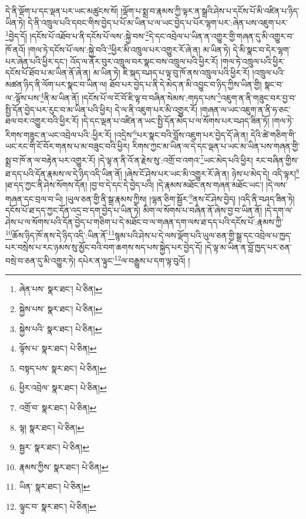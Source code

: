 དེ་ནི་ལྡོག་པ་དང་ལྡན་པར་ཡང་མཚུངས་སོ། །ལྡོག་པ་སྨྲ་བ་རྣམས་ཀྱི་ལྟར་ན་སྒྲའི་ཤེས་པ་དངོས་པོ་མི་འཛིན་པ་ཉིད་ཡིན་ཏེ། དེ་ནི་འཁྲུལ་པའི་དབང་གིས་བྱེད་པ་པོ་མ་ཡིན་པ་ལ་ཡང་བྱེད་པ་པོར་ལྷག་པར་:ཞེན་པས་འཇུག་པར་\footnote{ཞེན་པས་  སྣར་ཐང་།  པེ་ཅིན། }བྱེད་དོ། །དངོས་པོ་འཐོབ་པ་ནི་དངོས་པོ་ལས་:སྐྱེ་བས་\footnote{སྐྱེས་པས་  སྣར་ཐང་།  པེ་ཅིན། }དེ་དང་འབྲེལ་པ་ཡིན་ན་འགྱུར་གྱི་གཞན་དུ་མི་འགྱུར་བ་ཁོ་ནའོ། །གལ་ཏེ་དངོས་པོ་ལས་:སྐྱེ་བའི་\footnote{སྐྱེས་པའི་  སྣར་ཐང་།  པེ་ཅིན། }ཕྱིར་མི་འཁྲུལ་པར་འགྱུར་རོ་ཞེ་ན། མ་ཡིན་ཏེ། དེ་མི་སྣང་བ་དེར་ལྷག་པར་ཞེན་པའི་ཕྱིར་དང་། འོད་ལ་ནོར་བུར་འཁྲུལ་བར་སྣང་བས་འཁྲུལ་པའི་ཕྱིར་རོ། །གལ་ཏེ་འཁྲུལ་པའི་ཕྱིར་དངོས་པོ་ཐོབ་པ་མ་ཡིན་ནོ་ཞེ་ན། མ་ཡིན་ཏེ། ཇི་སྐད་བཤད་པ་ལྟ་བུ་ཁོ་ནས་འཁྲུལ་པའི་ཕྱིར་རོ། །འཁྲུལ་པའི་མཚན་ཉིད་ནི་ལོག་པར་སྣང་བ་ཡིན་ལ། ཐོབ་པར་བྱེད་པ་ནི་དེ་མེད་ན་མི་འབྱུང་བ་ཉིད་ཀྱིས་ཡིན་གྱི། སྣང་བ་ལ་:ལྟོས་པས་\footnote{ལྟོས་པ་  སྣར་ཐང་།  པེ་ཅིན། }ནི་མ་ཡིན་ནོ། །དངོས་པོ་ལ་ངོ་བོ་ཇི་ལྟ་བ་བཞིན་སེམས་:གཏད་པས་\footnote{བསྟད་པས་  སྣར་ཐང་།  པེ་ཅིན། }འཇུག་ན་ནི་གཟུང་བར་བྱ་བ་སྤྱི་དོན་བྱེད་པར་རུང་བ་མ་ཡིན་པའི་ཕྱིར། དེ་ལ་ནི་འཇུག་པར་མི་འགྱུར་རོ། །གཞན་ལ་ཡང་འཇུག་ན་ནི་ཧ་ཅང་ཐལ་བར་འགྱུར་བའི་ཕྱིར་རོ། །དེ་དང་ལྡན་པ་འཛིན་ན་ཡང་སྤྱི་དོན་མེད་པ་ལ་སོགས་པར་བཤད་ཟིན་ཏོ། །གལ་ཏེ་རིགས་གཟུང་ན་ཡང་འབྲེལ་པའི་:ཕྱིར་རོ། །འདྲེས་\footnote{ཕྱིར་འབྲེལ་  སྣར་ཐང་།  པེ་ཅིན། }པར་སྣང་བའི་བློས་འཇུག་པར་བྱེད་དོ་ཞེ་ན། དེའི་ཚེ་གཅིག་གི་ཡང་རང་གི་ངོ་བོར་གནས་པ་མ་བཟུང་བའི་ཕྱིར། རིགས་ཀྱང་མ་ཡིན་ལ་དེ་དང་ལྡན་པ་ཡང་མ་ཡིན་པས་གཞན་གྱི་སྨྲ་བ་ཁོ་ན་ལ་བརྟེན་པར་འགྱུར་རོ། །དེ་ལྟ་ན་ནི་འོ་ན་རྗེས་སུ་:འགྲོ་བ་འགའ་\footnote{འགྲོ་བ་  སྣར་ཐང་།  པེ་ཅིན། }ཡང་མེད་པའི་ཕྱིར། རང་བཞིན་གྱིས་ཐ་དད་པའི་དོན་རྣམས་ལ་དེ་ཉིད་འདི་ཡིན་ནོ། །ཞེས་ངོ་ཤེས་པར་ཡང་མི་འགྱུར་རོ་ཞེ་ན། ཉེས་པ་མེད་དེ། འདི་ལྟར།\footnote{ལྟ།  སྣར་ཐང་།  པེ་ཅིན། } །ཐ་དད་ཀྱང་ནི་ཤེས་སོགས་དོན། །བྱ་བ་དེ་དང་དེ་བྱེད་པའི། །དེ་རྣམས་མཐོང་ནས་གཞན་མཐོང་ཡང་། །དེ་ལས་གཞན་དང་བྲལ་བ་ཡི། །ཡུལ་ཅན་གྱི་ནི་སྒྲ་རྣམས་ཀྱིས། །ལྷན་ཅིག་སྦྱོར་\footnote{སྦྱར་  སྣར་ཐང་།  པེ་ཅིན། }ནས་ངོ་ཤེས་བྱེད། །འདི་ནི་བཤད་ཟིན་ཏེ། དངོས་པོ་ཐ་དད་ཀྱང་དོན་འདྲ་བ་དག་བྱེད་པ་ཡིན་ཏེ། མིག་ལ་སོགས་པ་བཞིན་ནོ་ཞེས་བྱ་བ་ཡིན་ནོ། །དེ་དག་ལ་ཤེས་པ་ལ་སོགས་པའི་དོན་བྱེད་པ་གཅིག་པ་དེ་མཐོང་བ་ལ་གཞན་དག་ལས་ཐ་དད་པའི་དངོས་པོ་:རྣམས་ཀྱི་\footnote{རྣམས་ཀྱིས་  སྣར་ཐང་།  པེ་ཅིན། }ཆོས་ཉིད་ཁོ་ནས་དེ་ཉིད་འདི་:ཡིན་ནོ་\footnote{ཡིན་  སྣར་ཐང་།  པེ་ཅིན། }སྙམ་པའི་ཤེས་པ་དེ་ལས་ལྡོག་པའི་ཡུལ་ཅན་གྱི་སྒྲ་དང་འབྲེལ་པ་ཁྱད་པར་བསྲེས་པ་རང་ཉམས་སུ་མྱོང་བའི་བག་ཆགས་སད་པས་སྐྱེད་པར་བྱེད་དོ། །དེ་ལྟ་མ་ཡིན་ན་བློ་ཁྱད་པར་ཅན་བསྲེ་བ་ཅན་དུ་མི་འགྱུར་ཏེ། དཔེར་ན་ལྟུང་\footnote{ལྟུང་བ་  སྣར་ཐང་།  པེ་ཅིན། }ལ་བརྒྱུས་པ་དག་ལྟ་བུའོ། །
